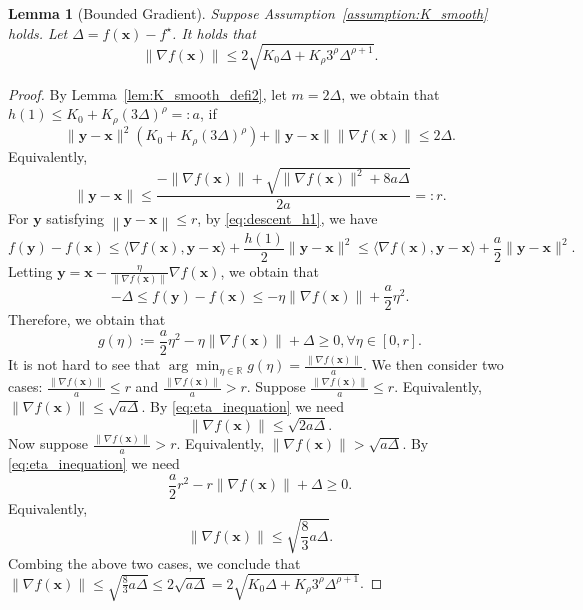 \documentclass{article}
\newtheorem{lemma}{Lemma}
\newcommand{\Norm}[1]{\left\|#1\right\|}
\newcommand{\Kr}{K_{\rho}}
\newcommand{\paren}[1]{\left( #1 \right)}
\newcommand{\bx}{\mathbf{x}}
\newcommand{\by}{\mathbf{y}}
\newcommand{\RR}{\mathbb{R}}
\begin{document}
\begin{lemma}[Bounded Gradient]\label{lem:bounded_gradient}
    Suppose Assumption~\ref{assumption:K_smooth} holds. Let $\Delta=f(\bx)-f^\star$. It holds that 
    \begin{equation}\label{eq:bounded_gradient}
        \|\nabla f(\bx)\|\leq 2\sqrt{K_0\Delta+\Kr 3^\rho\Delta^{\rho+1}}.
    \end{equation}
\end{lemma}

\begin{proof}
    By Lemma~\ref{lem:K_smooth_defi2}, let $m=2\Delta$, we obtain that
    $h(1)\leq K_0+\Kr\paren{3\Delta}^\rho=:a$, if 
    $$\|\by-\bx\|^2\paren{K_0+\Kr\paren{3\Delta}^\rho}+\|\by-\bx\|\|\nabla f(\bx)\|\leq 2\Delta.$$
    Equivalently, 
    $$\|\by-\bx\|\leq \frac{-\|\nabla f(\bx)\|+\sqrt{\|\nabla f(\bx)\|^2+8a\Delta}}{2a}=:r.$$
    For $\by$ satisfying $\Norm{\by-\bx}\leq r$, by \eqref{eq:descent_h1}, we have 
    $$f(\by)-f(\bx)\leq \langle\nabla f(\bx),\by-\bx\rangle+\frac{h(1)}{2}\|\by-\bx\|^2\leq \langle\nabla f(\bx),\by-\bx\rangle+\frac{a}{2}\|\by-\bx\|^2.$$
    Letting $\by=\bx-\frac{\eta}{\|\nabla f(\bx)\|}\nabla f(\bx)$, we obtain that
    $$-\Delta\leq f(\by)-f(\bx)\leq -\eta\|\nabla f(\bx)\|+\frac{a}{2}\eta^2.$$
    Therefore, we obtain that
    \begin{equation}\label{eq:eta_inequation}
        g(\eta):=\frac{a}{2}\eta^2-\eta\|\nabla f(\bx)\|+\Delta\geq 0, \forall \eta\in[0,r].
    \end{equation}
    It is not hard to see that $\arg\min_{\eta\in\RR} g(\eta)=\frac{\|\nabla f(\bx)\|}{a}$. We then consider two cases: $\frac{\|\nabla f(\bx)\|}{a}\leq r$ and $\frac{\|\nabla f(\bx)\|}{a}> r$.
     Suppose $\frac{\|\nabla f(\bx)\|}{a}\leq r$. Equivalently, $\|\nabla f(\bx)\|\leq \sqrt{a\Delta}.$
    By \eqref{eq:eta_inequation} we need
    $$\|\nabla f(\bx)\|\leq \sqrt{2a\Delta}.$$
    Now suppose $\frac{\|\nabla f(\bx)\|}{a}> r$. Equivalently, $\|\nabla f(\bx)\|>\sqrt{a\Delta}$. By \eqref{eq:eta_inequation} we need
    $$\frac{a}{2}r^2-r\|\nabla f(\bx)\|+\Delta\geq 0.$$
    Equivalently, 
    $$\|\nabla f(\bx)\|\leq \sqrt{\frac{8}{3}a\Delta}.$$
    Combing the above two cases, we conclude that $\|\nabla f(\bx)\|\leq \sqrt{\frac{8}{3}a\Delta}\leq 2\sqrt{a\Delta}=2\sqrt{K_0\Delta+\Kr3^\rho\Delta^{\rho+1}}$. 
\end{proof}
\end{document}

